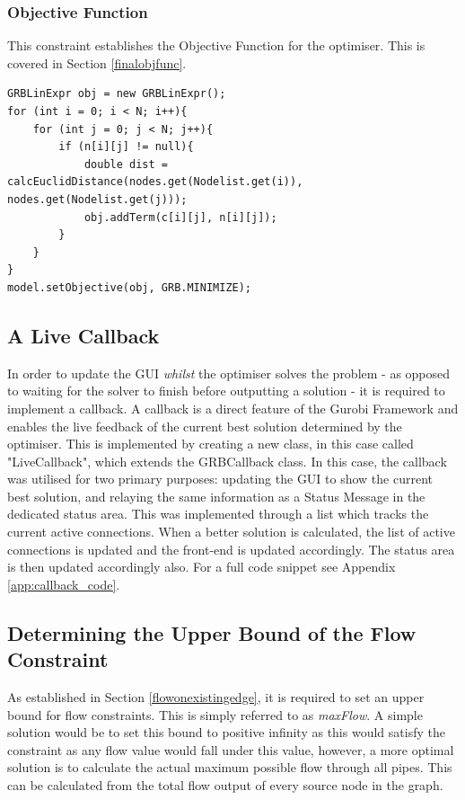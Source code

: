 \subsubsection{Objective Function}
This constraint establishes the Objective Function for the optimiser. This is covered in Section \ref{finalobjfunc}.
\begin{lstlisting}
GRBLinExpr obj = new GRBLinExpr();
for (int i = 0; i < N; i++){
    for (int j = 0; j < N; j++){
        if (n[i][j] != null){
            double dist = calcEuclidDistance(nodes.get(Nodelist.get(i)), nodes.get(Nodelist.get(j)));
            obj.addTerm(c[i][j], n[i][j]);
        }
    }
}
model.setObjective(obj, GRB.MINIMIZE);
\end{lstlisting}

\subsection{A Live Callback}
In order to update the GUI \textit{whilst} the optimiser solves the problem - as opposed to waiting for the solver to finish before outputting a solution - it is required to implement a callback. A callback is a direct feature of the Gurobi Framework and enables the live feedback of the current best solution determined by the optimiser. This is implemented by creating a new class, in this case called "LiveCallback", which extends the GRBCallback class. In this case, the callback was utilised for two primary purposes: updating the GUI to show the current best solution, and relaying the same information as a Status Message in the dedicated status area. This was implemented through a list which tracks the current active connections. When a better solution is calculated, the list of active connections is updated and the front-end is updated accordingly. The status area is then updated accordingly also. For a full code snippet see Appendix \ref{app:callback_code}.

\subsection{Determining the Upper Bound of the Flow Constraint}
As established in Section \ref{flowonexistingedge}, it is required to set an upper bound for flow constraints. This is simply referred to as \textit{maxFlow}. A simple solution would be to set this bound to positive infinity as this would satisfy the constraint as any flow value would fall under this value, however, a more optimal solution is to calculate the actual maximum possible flow through all pipes. This can be calculated from the total flow output of every source node in the graph.

